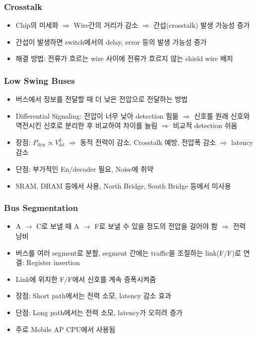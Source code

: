 \subsubsection*{Crosstalk}
\begin{itemize}
    \item Chip의 미세화 $\Rightarrow$ Wire간의 거리가 감소 $\Rightarrow$ 간섭(crosstalk) 발생 가능성 증가
    \item 간섭이 발생하면 switch에서의 delay, error 등의 발생 가능성 증가
    \item 해결 방법: 전류가 흐르는 wire 사이에 전류가 흐르지 않는 shield wire 배치
\end{itemize}

\subsubsection*{Low Swing Buses}
\begin{itemize}
    \item 버스에서 정보를 전달할 때 더 낮은 전압으로 전달하는 방법
    \item Differential Signaling: 전압이 너무 낮아 detection 힘듦 $\Rightarrow$
        신호를 원래 신호와 역전시킨 신호로 분리한 후 비교하여 차이를 늘림 $\Rightarrow$ 비교적 detection 쉬움
    \item 장점: $P_\mathrm{dyn} \varpropto V_{\mathrm{dd}}^2$ $\Rightarrow$ 동적 전력이 감소, Crosstalk 예방, 전압폭 감소 $\Rightarrow$ latency 감소
    \item 단점: 부가적인 En/decoder 필요, Noise에 취약
    \item SRAM, DRAM 등에서 사용, North Bridge, South Bridge 등에서 미사용
\end{itemize}

\subsubsection*{Bus Segmentation}
\begin{itemize}
    \item A $\rightarrow$ C로 보낼 때 A $\rightarrow$ F로 보낼 수 있을 정도의 전압을 걸어야 함 $\Rightarrow$ 전력 낭비
    \item 버스를 여러 segment로 분할, segment 간에는 traffic을 조절하는 link(F/F)로 연결: Register insertion
    \item Link에 위치한 F/F에서 신호를 계속 증폭시켜줌
    \item 장점: Short path에서는 전력 소모, latency 감소 효과
    \item 단점: Long path에서는 전력 소모, latency가 오히려 증가
    \item 주로 Mobile AP CPU에서 사용됨
\end{itemize}

